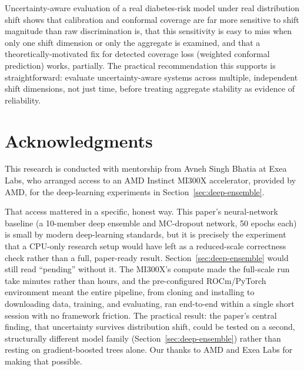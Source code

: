 \documentclass[11pt]{article}
\begin{document}
Uncertainty-aware evaluation of a real diabetes-risk model under real distribution shift shows that calibration and conformal coverage are far more sensitive to shift magnitude than raw discrimination is, that this sensitivity is easy to miss when only one shift dimension or only the aggregate is examined, and that a theoretically-motivated fix for detected coverage loss (weighted conformal prediction) works, partially. The practical recommendation this supports is straightforward: evaluate uncertainty-aware systems across multiple, independent shift dimensions, not just time, before treating aggregate stability as evidence of reliability.

\section*{Acknowledgments}

This research is conducted with mentorship from Avneh Singh Bhatia at Exea Labs, who arranged access to an AMD Instinct MI300X accelerator, provided by AMD, for the deep-learning experiments in Section~\ref{sec:deep-ensemble}.

That access mattered in a specific, honest way. This paper's neural-network baseline (a 10-member deep ensemble and MC-dropout network, 50 epochs each) is small by modern deep-learning standards, but it is precisely the experiment that a CPU-only research setup would have left as a reduced-scale correctness check rather than a full, paper-ready result. Section~\ref{sec:deep-ensemble} would still read ``pending'' without it. The MI300X's compute made the full-scale run take minutes rather than hours, and the pre-configured ROCm/PyTorch environment meant the entire pipeline, from cloning and installing to downloading data, training, and evaluating, ran end-to-end within a single short session with no framework friction. The practical result: the paper's central finding, that uncertainty survives distribution shift, could be tested on a second, structurally different model family (Section~\ref{sec:deep-ensemble}) rather than resting on gradient-boosted trees alone. Our thanks to AMD and Exea Labs for making that possible.



\end{document}
